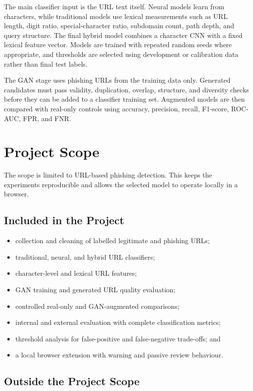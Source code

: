 The main classifier input is the URL text itself. Neural models learn from
characters, while traditional models use lexical measurements such as URL
length, digit ratio, special-character ratio, subdomain count, path depth, and
query structure. The final hybrid model combines a character CNN with a fixed
lexical feature vector. Models are trained with repeated random seeds where
appropriate, and thresholds are selected using development or calibration data
rather than final test labels.

The GAN stage uses phishing URLs from the training data only. Generated
candidates must pass validity, duplication, overlap, structure, and diversity
checks before they can be added to a classifier training set. Augmented models
are then compared with real-only controls using accuracy, precision, recall,
F1-score, ROC-AUC, FPR, and FNR.

\section{Project Scope}

The scope is limited to URL-based phishing detection. This keeps the experiments
reproducible and allows the selected model to operate locally in a browser.

\subsection{Included in the Project}

\begin{itemize}
\item collection and cleaning of labelled legitimate and phishing URLs;
\item traditional, neural, and hybrid URL classifiers;
\item character-level and lexical URL features;
\item GAN training and generated URL quality evaluation;
\item controlled real-only and GAN-augmented comparisons;
\item internal and external evaluation with complete classification metrics;
\item threshold analysis for false-positive and false-negative trade-offs; and
\item a local browser extension with warning and passive review behaviour.
\end{itemize}

\subsection{Outside the Project Scope}

